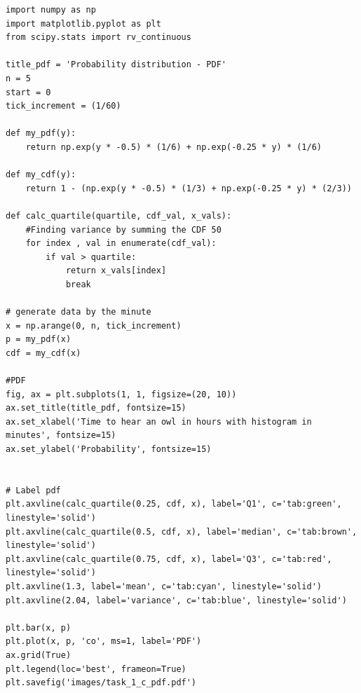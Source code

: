 \begin{lstlisting}[caption={Plotting the PDF and histogram)},label={lst:code_task_1_c}]
import numpy as np
import matplotlib.pyplot as plt
from scipy.stats import rv_continuous

title_pdf = 'Probability distribution - PDF'
n = 5
start = 0
tick_increment = (1/60)

def my_pdf(y):
    return np.exp(y * -0.5) * (1/6) + np.exp(-0.25 * y) * (1/6)

def my_cdf(y):
    return 1 - (np.exp(y * -0.5) * (1/3) + np.exp(-0.25 * y) * (2/3))

def calc_quartile(quartile, cdf_val, x_vals):
    #Finding variance by summing the CDF 50
    for index , val in enumerate(cdf_val):
        if val > quartile:
            return x_vals[index]
            break
            
# generate data by the minute
x = np.arange(0, n, tick_increment)
p = my_pdf(x)
cdf = my_cdf(x)

#PDF
fig, ax = plt.subplots(1, 1, figsize=(20, 10))
ax.set_title(title_pdf, fontsize=15)
ax.set_xlabel('Time to hear an owl in hours with histogram in minutes', fontsize=15)
ax.set_ylabel('Probability', fontsize=15)


# Label pdf
plt.axvline(calc_quartile(0.25, cdf, x), label='Q1', c='tab:green', linestyle='solid')
plt.axvline(calc_quartile(0.5, cdf, x), label='median', c='tab:brown', linestyle='solid')
plt.axvline(calc_quartile(0.75, cdf, x), label='Q3', c='tab:red', linestyle='solid')
plt.axvline(1.3, label='mean', c='tab:cyan', linestyle='solid')
plt.axvline(2.04, label='variance', c='tab:blue', linestyle='solid')

plt.bar(x, p)
plt.plot(x, p, 'co', ms=1, label='PDF')
ax.grid(True)
plt.legend(loc='best', frameon=True)
plt.savefig('images/task_1_c_pdf.pdf')
\end{lstlisting}


